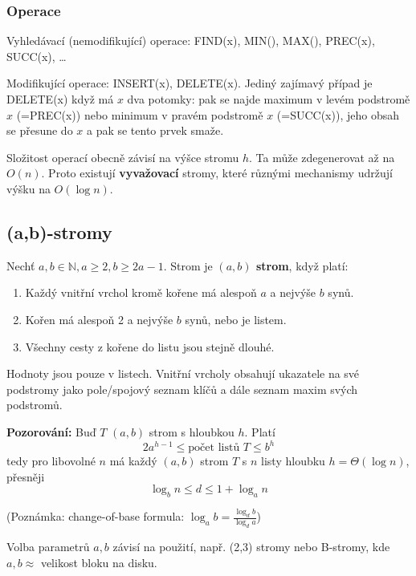 \documentclass[11pt]{report} %
\newcommand{\N}{\mathbb{N}}
\numberwithin{equation}{section}
\begin{document}
\subsubsection{Operace}
Vyhledávací (nemodifikující) operace: FIND(x), MIN(), MAX(), PREC(x), SUCC(x), \dots

Modifikující operace: INSERT(x), DELETE(x). Jediný zajímavý případ je DELETE(x) když má $x$ dva potomky: pak se najde maximum v levém podstromě $x$ (=PREC(x)) nebo minimum v pravém podstromě $x$ (=SUCC(x)), jeho obsah se přesune do $x$ a pak se tento prvek smaže.
	
Složitost operací obecně závisí na výšce stromu $h$. Ta může zdegenerovat až na $O(n)$. Proto existují \textbf{vyvažovací} stromy, které různými mechanismy udržují výšku na $O(\log n)$.


\subsection{(a,b)-stromy}
Nechť $a, b \in \N, a \geq 2, b \geq 2a-1$. Strom je \textbf{$(a, b)$ strom}, když platí:
\begin{enumerate}
	
	
	\item Každý vnitřní vrchol kromě kořene má alespoň $a$ a nejvýše $b$ synů.
	\item Kořen má alespoň 2 a nejvýše $b$ synů, nebo je listem.
	\item Všechny cesty z kořene do listu jsou stejně dlouhé.
\end{enumerate}

Hodnoty jsou pouze v listech. Vnitřní vrcholy obsahují ukazatele na své podstromy jako pole/spojový seznam klíčů a dále seznam maxim svých podstromů.

\noindent\textbf{Pozorování:} Buď $T$ $(a, b)$ strom s hloubkou $h$. Platí 
$$2a^{h-1} \leq \text{počet listů } T \leq b^h$$
tedy pro libovolné $n$ má každý $(a, b)$ strom $T$ s $n$ listy hloubku $h = \Theta(\log n)$, přesněji
$$\log_b n \leq d \leq 1 + \log_a n$$

(Poznámka: change-of-base formula: $\log_a b = \frac{\log_d b}{\log_d a}$)

Volba parametrů $a,b$ závisí na použití, např. (2,3) stromy nebo B-stromy, kde $a,b \approx $ velikost bloku na disku.
\end{document}
